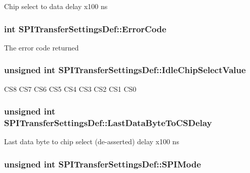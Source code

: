 \-Chip select to data delay x100 ns \hypertarget{struct_s_p_i_transfer_settings_def_a06e000b94a109cb22dd362ec768eedc7}{
\subsubsection[{\-Error\-Code}]{\setlength{\rightskip}{0pt plus 5cm}int {\bf \-S\-P\-I\-Transfer\-Settings\-Def\-::\-Error\-Code}}}\label{struct_s_p_i_transfer_settings_def_a06e000b94a109cb22dd362ec768eedc7}
\-The error code returned \hypertarget{struct_s_p_i_transfer_settings_def_a2f469778bc45bfaae06c0779c53457a9}{
\subsubsection[{\-Idle\-Chip\-Select\-Value}]{\setlength{\rightskip}{0pt plus 5cm}unsigned int {\bf \-S\-P\-I\-Transfer\-Settings\-Def\-::\-Idle\-Chip\-Select\-Value}}}\label{struct_s_p_i_transfer_settings_def_a2f469778bc45bfaae06c0779c53457a9}
\-C\-S8 \-C\-S7 \-C\-S6 \-C\-S5 \-C\-S4 \-C\-S3 \-C\-S2 \-C\-S1 \-C\-S0 \hypertarget{struct_s_p_i_transfer_settings_def_a5c05d83e86f6d4cb9437d00a4c7a38a2}{
\subsubsection[{\-Last\-Data\-Byte\-To\-C\-S\-Delay}]{\setlength{\rightskip}{0pt plus 5cm}unsigned int {\bf \-S\-P\-I\-Transfer\-Settings\-Def\-::\-Last\-Data\-Byte\-To\-C\-S\-Delay}}}\label{struct_s_p_i_transfer_settings_def_a5c05d83e86f6d4cb9437d00a4c7a38a2}
\-Last data byte to chip select (de-\/asserted) delay x100 ns \hypertarget{struct_s_p_i_transfer_settings_def_a362c078515ae312b89face990d02d6c6}{
\subsubsection[{\-S\-P\-I\-Mode}]{\setlength{\rightskip}{0pt plus 5cm}unsigned int {\bf \-S\-P\-I\-Transfer\-Settings\-Def\-::\-S\-P\-I\-Mode}}}\label{struct_s_p_i_transfer_settings_def_a362c078515ae312b89face990d02d6c6}
